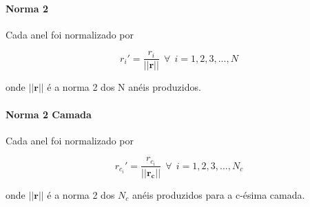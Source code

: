 %
%
%
%
%



\paragraph{Norma 2}
\label{par:norm2}

Cada anel foi normalizado por

\begin{equation}
r_{i}' = \frac{r_i}{||\mathbf{r}||}~~\forall~~i=1,2,3,...,N
\end{equation}

\noindent onde $||\mathbf{r}||$ é a norma 2 dos N anéis produzidos.

\paragraph{Norma 2 Camada}
\label{par:norm_camada}

Cada anel foi normalizado por

\begin{equation}
r_{c_i}' = \frac{r_{c_i}}{||\mathbf{r_c}||}~~\forall~~i=1,2,3,...,N_c
\end{equation}

\noindent onde $||\mathbf{r}||$ é a norma 2 dos $N_c$ anéis produzidos para a
c-ésima camada.

